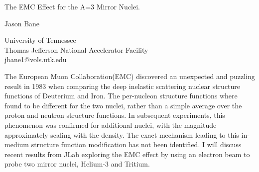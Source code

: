\documentclass[a4paper]{article}
\begin{document}

\Large
 \begin{center}
The EMC Effect for the A=3 Mirror Nuclei.\\ 

\hspace{10pt}

\Large
Jason Bane\\

\hspace{10pt}

\normalsize  
University of Tennessee\\
Thomas Jefferson National Accelerator Facility\\
jbane1@vols.utk.edu\\

\end{center}

\hspace{10pt}

\large
The European Muon Collaboration(EMC) discovered an unexpected and puzzling result in 1983 when comparing the deep inelastic scattering nuclear structure functions of Deuterium and Iron. The per-nucleon structure functions where found to be different for the two nuclei, rather than a simple average over the proton and neutron structure functions.  In subsequent experiments, this phenomenon was confirmed for additional nuclei, with the magnitude approximately scaling with the density.  The exact mechanism leading to this in-medium structure function modification has not been identified.  I will discuss recent results from JLab exploring the EMC effect by using an electron beam to probe two mirror nuclei, Helium-3 and Tritium. 
\end{document}
